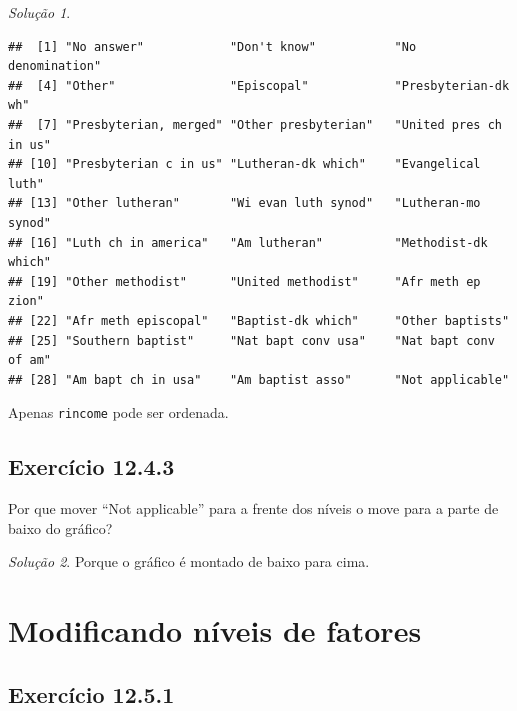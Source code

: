 \documentclass[
]{latex/krantz}
\newenvironment{Shaded}{\begin{snugshade}}{\end{snugshade}}
\newcommand{\FunctionTok}[1]{\textcolor[rgb]{0.13,0.29,0.53}{\textbf{#1}}}
\newcommand{\NormalTok}[1]{#1}
\newcommand{\SpecialCharTok}[1]{\textcolor[rgb]{0.81,0.36,0.00}{\textbf{#1}}}
\theoremstyle{definition}
\theoremstyle{definition}
\theoremstyle{definition}
\theoremstyle{definition}
\theoremstyle{remark}
\newtheorem*{solution}{Solução}
\begin{document}
\begin{solution}
\begin{Shaded}
\end{Shaded}

\begin{verbatim}
##  [1] "No answer"            "Don't know"           "No denomination"     
##  [4] "Other"                "Episcopal"            "Presbyterian-dk wh"  
##  [7] "Presbyterian, merged" "Other presbyterian"   "United pres ch in us"
## [10] "Presbyterian c in us" "Lutheran-dk which"    "Evangelical luth"    
## [13] "Other lutheran"       "Wi evan luth synod"   "Lutheran-mo synod"   
## [16] "Luth ch in america"   "Am lutheran"          "Methodist-dk which"  
## [19] "Other methodist"      "United methodist"     "Afr meth ep zion"    
## [22] "Afr meth episcopal"   "Baptist-dk which"     "Other baptists"      
## [25] "Southern baptist"     "Nat bapt conv usa"    "Nat bapt conv of am" 
## [28] "Am bapt ch in usa"    "Am baptist asso"      "Not applicable"
\end{verbatim}

Apenas \texttt{rincome} pode ser ordenada.
\end{solution}

\hypertarget{exr12-4-3}{%
\subsection*{Exercício 12.4.3}\label{exr12-4-3}}

Por que mover ``Not applicable'' para a frente dos níveis o move para a parte de baixo do gráfico?

\begin{solution}
Porque o gráfico é montado de baixo para cima.
\end{solution}

\hypertarget{modificando-nuxedveis-de-fatores}{%
\section{Modificando níveis de fatores}\label{modificando-nuxedveis-de-fatores}}

\hypertarget{exr12-5-1}{%
\subsection*{Exercício 12.5.1}\label{exr12-5-1}}
\end{document}
